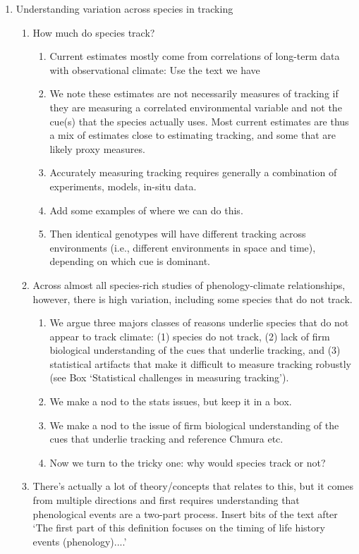 \documentclass[11pt,letterpaper]{article}
\begin{document}
\begin{enumerate}
\item Understanding variation across species in tracking
\begin{enumerate}
\item How much do species track? 
\begin{enumerate}
\item Current estimates mostly come from correlations of long-term data with observational climate: Use the text we have 
\item We note these estimates are not necessarily measures of tracking if they are measuring a correlated environmental variable and not the cue(s) that the species actually uses. Most current estimates are thus a mix of estimates close to estimating tracking, and some that are likely proxy measures.
\item Accurately measuring tracking requires generally a combination of experiments, models, in-situ data. 
\item Add some examples of where we can do this.
\item Then identical genotypes will have different tracking across environments (i.e., different environments in space and time), depending on which cue is dominant. 
\end{enumerate}
\item Across almost all species-rich studies of phenology-climate relationships, however, there is high variation, including some species that do not track. 
\begin{enumerate}
\item We argue three majors classes of reasons underlie species that do not appear to track climate: (1) species do not track, (2) lack of firm biological understanding of the cues that underlie tracking, and (3) statistical artifacts that make it difficult to measure tracking robustly (see Box `Statistical challenges in measuring tracking'). 
\item We make a nod to the stats issues, but keep it in a box.
\item We make a nod to the issue of firm biological understanding of the cues that underlie tracking and reference Chmura etc.
\item Now we turn to the tricky one: why would species track or not?
\end{enumerate}
\item There's actually a lot of theory/concepts that relates to this, but it comes from multiple directions and first requires understanding that phenological events are a two-part process. Insert bits of the text after `The first part of this definition focuses on the timing of life history events (phenology)....'

\end{enumerate}
\end{enumerate}
\end{document}
